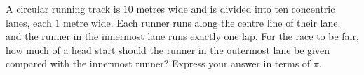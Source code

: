 A circular running track is $10$ metres wide and is divided into ten concentric lanes, each $1$ metre wide. Each runner runs along the centre line of their lane, and the runner in the innermost lane runs exactly one lap. For the race to be fair, how much of a head start should the runner in the outermost lane be given compared with the innermost runner? Express your answer in terms of $\pi$.
